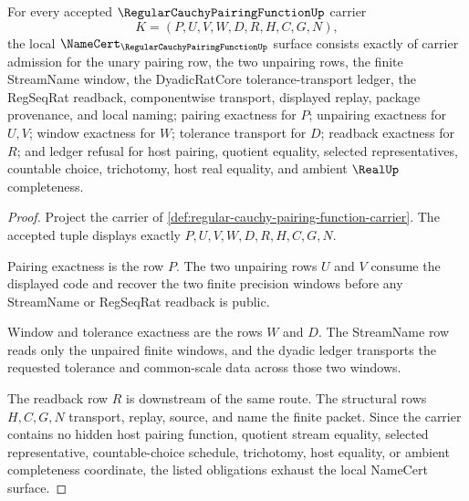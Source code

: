 \begin{theorem}
\label{thm:regular-cauchy-pairing-function-namecert-obligations}
For every accepted $\RegularCauchyPairingFunctionUp$ carrier
$$
K=(P,U,V,W,D,R,H,C,G,N),
$$
the local $\NameCert_{\RegularCauchyPairingFunctionUp}$ surface consists exactly of carrier admission for the unary pairing row, the two unpairing rows, the finite StreamName window, the DyadicRatCore tolerance-transport ledger, the RegSeqRat readback, componentwise transport, displayed replay, package provenance, and local naming; pairing exactness for $P$; unpairing exactness for $U,V$; window exactness for $W$; tolerance transport for $D$; readback exactness for $R$; and ledger refusal for host pairing, quotient equality, selected representatives, countable choice, trichotomy, host real equality, and ambient $\RealUp$ completeness.
\end{theorem}
\begin{proof}
Project the carrier of \autoref{def:regular-cauchy-pairing-function-carrier}. The accepted tuple displays exactly $P,U,V,W,D,R,H,C,G,N$.

Pairing exactness is the row $P$. The two unpairing rows $U$ and $V$ consume the displayed code and recover the two finite precision windows before any StreamName or RegSeqRat readback is public.

Window and tolerance exactness are the rows $W$ and $D$. The StreamName row reads only the unpaired finite windows, and the dyadic ledger transports the requested tolerance and common-scale data across those two windows.

The readback row $R$ is downstream of the same route. The structural rows $H,C,G,N$ transport, replay, source, and name the finite packet. Since the carrier contains no hidden host pairing function, quotient stream equality, selected representative, countable-choice schedule, trichotomy, host equality, or ambient completeness coordinate, the listed obligations exhaust the local NameCert surface.
\end{proof}

